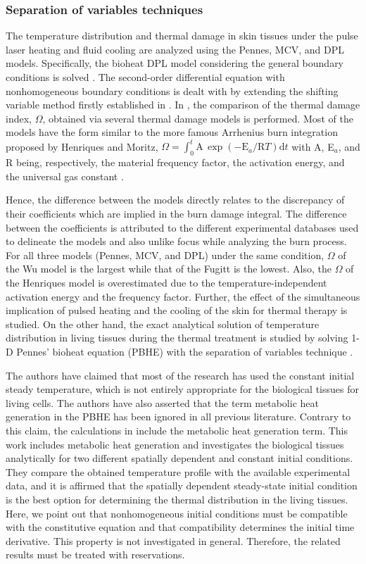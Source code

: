 \documentclass[sn-mathphys]{sn-jnl}%
\theoremstyle{thmstyleone}%
\theoremstyle{thmstyletwo}%
\theoremstyle{thmstylethree}%
\begin{document}
\subsubsection{Separation of variables techniques}
The temperature distribution and thermal damage in skin tissues under the pulse laser heating and fluid cooling are analyzed using the Pennes, MCV, and DPL models. Specifically, the bioheat DPL model considering the general boundary conditions is solved \cite{Lin2016}. The second-order differential equation with nonhomogeneous boundary conditions is dealt with by extending the shifting variable method firstly established in \cite{Lin1996}. In \cite{Lin2016}, the comparison of the thermal damage index, $\Omega$, obtained via several thermal damage models is performed. Most of the models have the form similar to the more famous Arrhenius burn integration proposed by Henriques and Moritz, $\Omega=\int_{0}^{t} \mathrm{A}\,\exp(-\mathrm{E}_a/\mathrm{R}T) \textrm{d}t$ with A, E$_a$, and R being, respectively, the material frequency factor, the activation energy, and the universal gas constant \cite{FXu2010ch}.

Hence, the difference between the models directly relates to the discrepancy of their coefficients which are implied in the burn damage integral. The difference between the coefficients is attributed to the different experimental databases used to delineate the models and also unlike focus while analyzing the burn process. For all three models (Pennes, MCV, and DPL) under the same condition, $\Omega$ of the Wu model is the largest while that of the Fugitt is the lowest. Also, the $\Omega$ of the Henriques model is overestimated due to the temperature-independent activation energy and the frequency factor. Further, the effect of the simultaneous implication of pulsed heating and the cooling of the skin for thermal therapy is studied. On the other hand, the exact analytical solution of temperature distribution in living tissues during the thermal treatment is studied by solving 1-D Pennes' bioheat equation (PBHE) with the separation of variables technique \cite{Dutta2017}.

The authors have claimed that most of the research has used the constant initial steady temperature, which is not entirely appropriate for the biological tissues for living cells. The authors have also asserted that the term metabolic heat generation in the PBHE has been ignored in all previous literature. Contrary to this claim, the calculations in \cite{Askarizadeh2015} include the metabolic heat generation term. This work includes metabolic heat generation and investigates the biological tissues analytically for two different spatially dependent and constant initial conditions. They compare the obtained temperature profile with the available experimental data, and it is affirmed that the spatially dependent steady-state initial condition is the best option for determining the thermal distribution in the living tissues. Here, we point out that nonhomogeneous initial conditions must be compatible with the constitutive equation and that compatibility determines the initial time derivative. This property is not investigated in general. Therefore, the related results must be treated with reservations.
\end{document}
